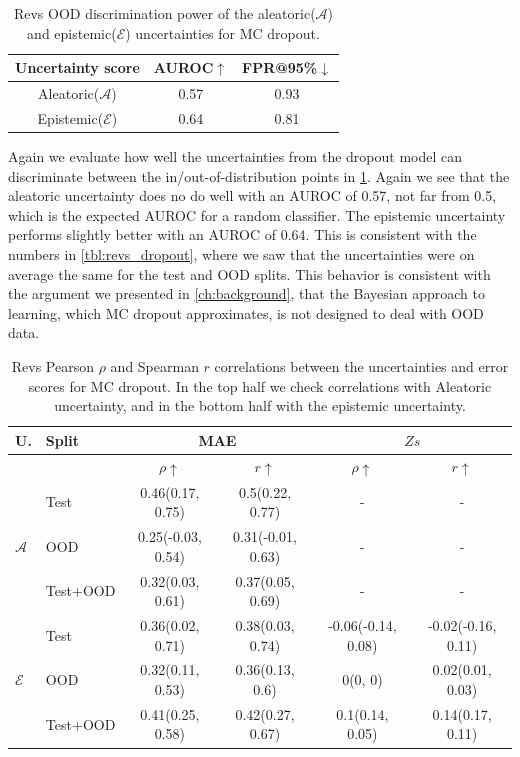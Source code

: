 \begin{table}[htbp]
\centering
    \begin{tabular}{c  c  c}  
        \toprule
        Uncertainty score & AUROC$\uparrow$ & FPR@95\%$\downarrow$\\
        \midrule
        Aleatoric($\mathcal{A}$) & 0.57  & 0.93\\
        Epistemic($\mathcal{E}$) & 0.64 &  0.81 \\
        \midrule
    \end{tabular}
    \caption{Revs OOD discrimination power of the aleatoric($\mathcal{A}$) and epistemic($\mathcal{E}$) uncertainties for MC dropout.}
    \label{tbl:revs_dropout_discrimination}
\end{table}


Again we evaluate how well the uncertainties from the dropout model can discriminate between the in/out-of-distribution points in \cref{tbl:revs_dropout_discrimination}. Again we see that the aleatoric uncertainty does no do well with an AUROC of 0.57, not far from 0.5, which is the expected AUROC for a random classifier. The epistemic uncertainty performs slightly better with an AUROC of 0.64. This is consistent with the numbers in \cref{tbl:revs_dropout}, where we saw that the uncertainties were on average the same for the test and OOD splits. This behavior is consistent with the argument we presented in \cref{ch:background}, that the Bayesian approach to learning, which MC dropout approximates, is not designed to deal with OOD data. 


\begin{table}[htbp]
\centering
    \begin{tabular}{l l c c c c}  
        \toprule
        U. & Split & \multicolumn{2}{c}{MAE} & \multicolumn{2}{c}{$Zs$}\\
        \midrule
        & & $\rho \uparrow$ & $r \uparrow$ & $\rho \uparrow$ & $r \uparrow$ \\
        \multirow{3}{*}{$\mathcal{A}$} 
            & Test     & 0.46(0.17, 0.75) & 0.5(0.22, 0.77) & - & - \\  
            & OOD      & 0.25(-0.03, 0.54) & 0.31(-0.01, 0.63) & - & - \\  
            & Test+OOD & 0.32(0.03, 0.61) & 0.37(0.05, 0.69) & - & - \\ 

        \midrule
        \multirow{3}{*}{$\mathcal{E}$} 
            & Test     & 0.36(0.02, 0.71)  & 0.38(0.03, 0.74) &  -0.06(-0.14, 0.08)  & -0.02(-0.16, 0.11) \\ & OOD      & 0.32(0.11, 0.53) & 0.36(0.13, 0.6) &  0(0, 0) & 0.02(0.01, 0.03) \\
            & Test+OOD & 0.41(0.25, 0.58) & 0.42(0.27, 0.67) &  0.1(0.14, 0.05) & 0.14(0.17, 0.11) \\ 

        \toprule
    \end{tabular}
    \caption{Revs Pearson $\rho$ and Spearman $r$ correlations between the uncertainties and error scores for MC dropout. In the top half we check correlations with Aleatoric uncertainty, and in the bottom half with the epistemic uncertainty.}
    \label{tbl:revs_dropout_corr}
\end{table}

